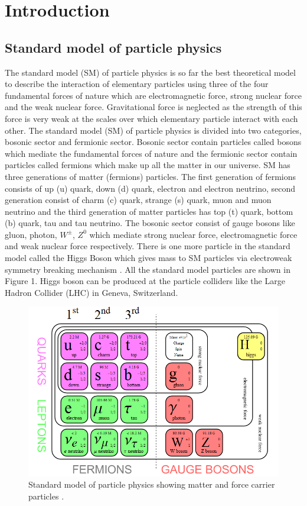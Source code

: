 \newpage

\section{Introduction}
\label{sec:intro}

\subsection{Standard model of particle physics}
\onehalfspacing The standard model (SM) of particle physics is so far the best theoretical model to describe the interaction of elementary 
particles using three of the four fundamental forces of nature which are electromagnetic force, strong nuclear force and the weak nuclear force. Gravitational force is neglected as the strength of this force is very weak at the scales over which elementary particle interact with each other. The standard model (SM) of particle physics is divided into two categories, bosonic sector and fermionic sector. Bosonic sector contain particles called bosons which mediate the fundamental forces of nature and the fermionic sector contain particles called fermions which make up all the matter in our universe. SM has three generations of matter (fermions) particles. The first generation of fermions consists of up (u) quark, down (d) quark, electron and electron neutrino, second generation consist of charm (c) quark, strange (s) quark, muon and muon neutrino and the third generation of matter particles has top (t) quark, bottom (b) quark, tau and tau neutrino. The bosonic sector consist of gauge bosons like gluon, photon, $W^{\pm}$, $Z^0$ which mediate strong nuclear force, electromagnetic force and weak nuclear force respectively. There is one more particle in the standard model called the Higgs Boson which gives mass to SM particles via electroweak symmetry breaking mechanism \cite{Chatrchyan:2012xdj}. All the standard model particles are shown in Figure 1. Higgs boson can be produced at the particle colliders like the Large Hadron Collider (LHC) in Geneva, Switzerland. \\

\begin{figure}[H]
  \centering
  \includegraphics[width=0.7\columnwidth]{./SM.png}
  \caption{\onehalfspacing Standard model of particle physics showing matter and force carrier particles \cite{smpp}.}
  \label{fig:LHC}
\end{figure}



